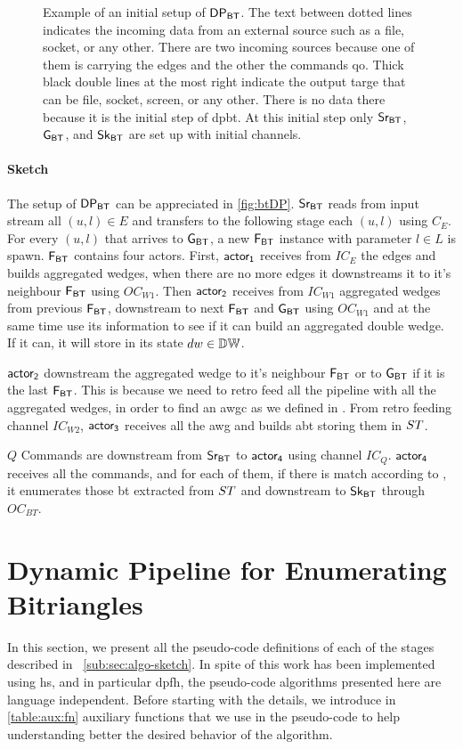 \begin{figure}[h]
\centering  
{}
\caption[{[\acrshort{iebt}] $\dpbt$ Initial setup}]{Example of an initial setup of $\dpbt$. The text between dotted lines indicates the incoming data from an external source such as a file, socket, or any other. There are two incoming sources because one of them is carrying the edges and the other the commands \acrshort{qo}. Thick black double lines at the most right indicate the output targe that can be file, socket, screen, or any other. There is no data there because it is the initial step of \acrshort{dpbt}. At this initial step only $\mathsf{Sr_{BT}}$, $\mathsf{G_{BT}}$, and $\mathsf{Sk_{BT}}$ are set up with initial channels.}
\label{fig:btDP}
\end{figure}

\paragraph{Sketch} The setup of $\dpbt$ can be appreciated in \autoref{fig:btDP}. $\mathsf{Sr_{BT}}$ reads from input stream all $(u,l) \in E$ and transfers to the following stage each $(u,l)$ using $C_E$.
For every $(u,l)$ that arrives to $\mathsf{G_{BT}}$, a new $\mathsf{F_{BT}}$ instance with parameter $l \in L$ is spawn. $\mathsf{F_{BT}}$ contains four actors. 
First, $\mathsf{actor_1}$ receives from $IC_E$ the edges and builds aggregated wedges, when there are no more edges it downstreams it to it's neighbour $\mathsf{F_{BT}}$ using $OC_{W1}$. 
Then $\mathsf{actor_2}$ receives from $IC_{W1}$ aggregated wedges from previous $\mathsf{F_{BT}}$, downstream to next $\mathsf{F_{BT}}$ and $\mathsf{G_{BT}}$ using $OC_{W1}$ and at the same time use its information to see 
if it can build an aggregated double wedge. If it can, it will store in its state $dw \in \mathbb{DW}$.

$\mathsf{actor_2}$ downstream the aggregated wedge to  it's neighbour $\mathsf{F_{BT}}$ or to $\mathsf{G_{BT}}$ if it is the last $\mathsf{F_{BT}}$. This is because we need to retro feed all the pipeline with all the aggregated wedges, in order to find an \acrfull{awgc} as we defined in .
From retro feeding channel $IC_{W2}$, $\mathsf{actor_3}$ receives all the \acrshort{awg}  and builds \acrshort{abt} storing them in $ST$. 

$Q$ Commands are downstream from $\mathsf{Sr_{BT}}$ to $\mathsf{actor_4}$ using channel $IC_Q$. $\mathsf{actor_4}$ receives all the commands, and for each of them, if there is match according to , it enumerates those \acrshort{bt} extracted from $ST$ and downstream to $\mathsf{Sk_{BT}}$ through $OC_{BT}$.

\section{Dynamic Pipeline for Enumerating Bitriangles}\label{sub:sec:iebt:dpalgo}
In this section, we present all the pseudo-code definitions of each of the stages described in ~\autoref{sub:sec:algo-sketch}. 
In spite of this work has been implemented using \acrshort{hs}, and in particular \acrshort{dpfh}, the pseudo-code algorithms presented here are language independent.
Before starting with the details, we introduce in \autoref{table:aux:fn} auxiliary functions that we use in the pseudo-code to help understanding better the desired behavior of the algorithm.

